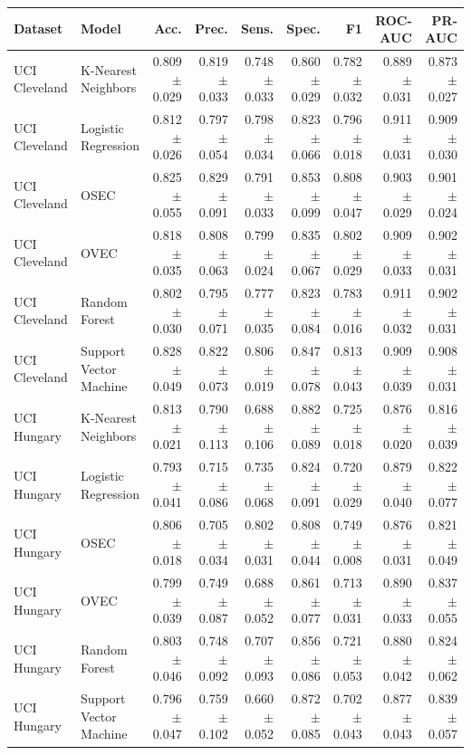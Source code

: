 \begin{tabular}{llrrrrrrr}
\toprule
Dataset & Model & Acc. & Prec. & Sens. & Spec. & F1 & ROC-AUC & PR-AUC \\
\midrule
UCI Cleveland & K-Nearest Neighbors & 0.809 $\pm$ 0.029 & 0.819 $\pm$ 0.033 & 0.748 $\pm$ 0.033 & 0.860 $\pm$ 0.029 & 0.782 $\pm$ 0.032 & 0.889 $\pm$ 0.031 & 0.873 $\pm$ 0.027 \\
UCI Cleveland & Logistic Regression & 0.812 $\pm$ 0.026 & 0.797 $\pm$ 0.054 & 0.798 $\pm$ 0.034 & 0.823 $\pm$ 0.066 & 0.796 $\pm$ 0.018 & 0.911 $\pm$ 0.031 & 0.909 $\pm$ 0.030 \\
UCI Cleveland & OSEC & 0.825 $\pm$ 0.055 & 0.829 $\pm$ 0.091 & 0.791 $\pm$ 0.033 & 0.853 $\pm$ 0.099 & 0.808 $\pm$ 0.047 & 0.903 $\pm$ 0.029 & 0.901 $\pm$ 0.024 \\
UCI Cleveland & OVEC & 0.818 $\pm$ 0.035 & 0.808 $\pm$ 0.063 & 0.799 $\pm$ 0.024 & 0.835 $\pm$ 0.067 & 0.802 $\pm$ 0.029 & 0.909 $\pm$ 0.033 & 0.902 $\pm$ 0.031 \\
UCI Cleveland & Random Forest & 0.802 $\pm$ 0.030 & 0.795 $\pm$ 0.071 & 0.777 $\pm$ 0.035 & 0.823 $\pm$ 0.084 & 0.783 $\pm$ 0.016 & 0.911 $\pm$ 0.032 & 0.902 $\pm$ 0.031 \\
UCI Cleveland & Support Vector Machine & 0.828 $\pm$ 0.049 & 0.822 $\pm$ 0.073 & 0.806 $\pm$ 0.019 & 0.847 $\pm$ 0.078 & 0.813 $\pm$ 0.043 & 0.909 $\pm$ 0.039 & 0.908 $\pm$ 0.031 \\
UCI Hungary & K-Nearest Neighbors & 0.813 $\pm$ 0.021 & 0.790 $\pm$ 0.113 & 0.688 $\pm$ 0.106 & 0.882 $\pm$ 0.089 & 0.725 $\pm$ 0.018 & 0.876 $\pm$ 0.020 & 0.816 $\pm$ 0.039 \\
UCI Hungary & Logistic Regression & 0.793 $\pm$ 0.041 & 0.715 $\pm$ 0.086 & 0.735 $\pm$ 0.068 & 0.824 $\pm$ 0.091 & 0.720 $\pm$ 0.029 & 0.879 $\pm$ 0.040 & 0.822 $\pm$ 0.077 \\
UCI Hungary & OSEC & 0.806 $\pm$ 0.018 & 0.705 $\pm$ 0.034 & 0.802 $\pm$ 0.031 & 0.808 $\pm$ 0.044 & 0.749 $\pm$ 0.008 & 0.876 $\pm$ 0.031 & 0.821 $\pm$ 0.049 \\
UCI Hungary & OVEC & 0.799 $\pm$ 0.039 & 0.749 $\pm$ 0.087 & 0.688 $\pm$ 0.052 & 0.861 $\pm$ 0.077 & 0.713 $\pm$ 0.031 & 0.890 $\pm$ 0.033 & 0.837 $\pm$ 0.055 \\
UCI Hungary & Random Forest & 0.803 $\pm$ 0.046 & 0.748 $\pm$ 0.092 & 0.707 $\pm$ 0.093 & 0.856 $\pm$ 0.086 & 0.721 $\pm$ 0.053 & 0.880 $\pm$ 0.042 & 0.824 $\pm$ 0.062 \\
UCI Hungary & Support Vector Machine & 0.796 $\pm$ 0.047 & 0.759 $\pm$ 0.102 & 0.660 $\pm$ 0.052 & 0.872 $\pm$ 0.085 & 0.702 $\pm$ 0.043 & 0.877 $\pm$ 0.043 & 0.839 $\pm$ 0.057 \\

\end{tabular}
